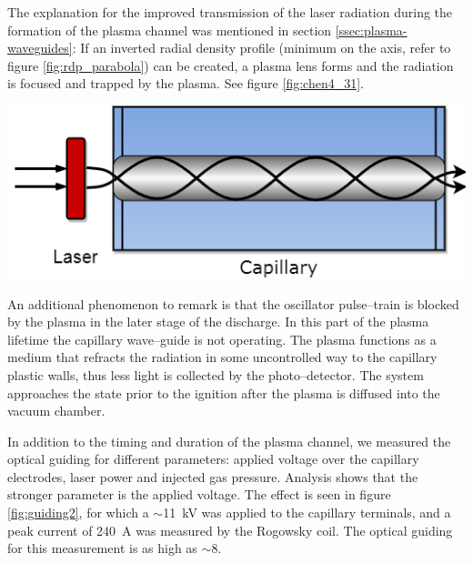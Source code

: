 \documentclass[../main.tex]{subfiles}
\begin{document}
The explanation for the improved transmission of the laser radiation during the formation of the plasma channel was mentioned in section \ref{ssec:plasma-waveguides}: If an inverted radial density profile (minimum on the axis, refer to figure \ref{fig:rdp_parabola}) can be created, a plasma lens forms and the radiation is focused and trapped by the plasma. See figure \ref{fig:chen4_31}.
\begin{marginfigure}
\includegraphics[width=\marginparwidth]{figures/chen4_31.png}
\caption{Plasma confined inside the capillary will trap the \SI{800}{\nm} laser light only if the plasma has a density minimum on axis.}
\label{fig:chen4_31}
\end{marginfigure}

An additional phenomenon to remark is that the oscillator pulse--train is blocked by the plasma in the later stage of the discharge. In this part of the plasma lifetime the capillary wave--guide is not operating. The plasma functions as a medium that refracts the radiation in some uncontrolled way to the capillary plastic walls, thus less light is collected by the photo--detector. The system approaches the state prior to the ignition after the plasma is diffused into the vacuum chamber.

In addition to the timing and duration of the plasma channel, we measured the optical guiding for different parameters: applied voltage over the capillary electrodes, laser power and injected gas pressure. Analysis shows that the stronger parameter is the applied voltage. The effect is seen in figure \ref{fig:guiding2}, for which a $\sim$\SI{11}{\kilo\volt} was applied to the capillary terminals, and a peak current of \SI{240}{\A} was measured by the Rogowsky coil. The optical guiding for this measurement is as high as $\sim 8$.
\end{document}
